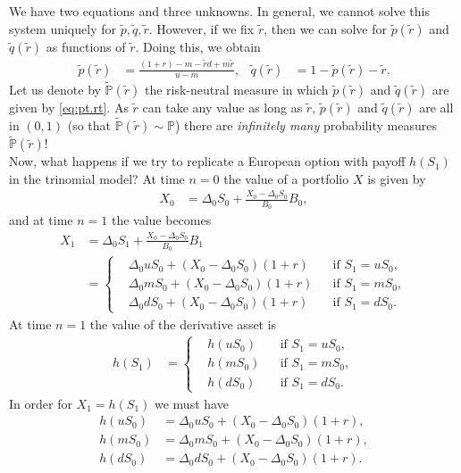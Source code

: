 \documentclass[12pt]{book}
\numberwithin{equation}{chapter}
\theoremstyle{plain}
\numberwithin{theorem}{section}
\theoremstyle{definition}
\numberwithin{exercise}{chapter}
\newcommand{\<}{\langle}
\renewcommand{\>}{\rangle}
\renewcommand{\(}{\left(}
\renewcommand{\)}{\right)}
\renewcommand{\[}{\left[}
\renewcommand{\]}{\right]}
\newcommand\Pb{\mathds{P}}
\newcommand\Del{\Delta}
\newcommand\Pbt{\widetilde{\Pb}}
\newcommand\qt{\widetilde{q}}
\newcommand\rt{\widetilde{r}}
\theoremstyle{definition}
\numberwithin{question}{section}
\newcommand\pt{\widetilde{p}}
\begin{document}
We have two equations and three unknowns. In general, we cannot solve this system uniquely for $\pt, \qt, \rt$.  However, if we fix $\rt$, then we can solve for $\pt (\rt)$ and $\qt (\rt)$ as functions of $\rt$.  Doing this, we obtain
\begin{align}
\pt (\rt) &= \frac{(1+r) - m - \rt d +  m \rt}{u - m} , &
\qt (\rt) &= 1 - \pt (\rt) - \rt . \label{eq:pt.rt}
\end{align}
Let us denote by $\Pbt (\rt)$ the risk-neutral measure in which $\pt(\rt)$ and $\qt(\rt)$ are given by \eqref{eq:pt.rt}.
As $\rt$ can take any value as long as $\rt$, $\pt(\rt)$ and $\qt(\rt)$ are all in $(0,1)$ (so that $\Pbt(\rt) \sim \Pb$) 
there are \textit{infinitely many} probability measures $\Pbt (\rt)$!
\\[0.5em]
Now, what happens if we try to replicate a European option with payoff $h(S_1)$ in the trinomial model? At time $n=0$ the value of a portfolio $X$ is given by
\begin{align}
X_0 
	&= \Del_0 S_0 +\frac{X_0 - \Delta_0 S_0}{B_0} B_0 ,
\end{align}
and at time $n=1$ the value becomes
\begin{align}
X_1 &= \Delta_0 S_1 + \frac{X_0 - \Delta_0 S_0}{B_0} B_1 \\
		&=	\left\{
		\begin{aligned}
			&\Delta_0 u S_0 + (X_0 - \Delta_0 S_0) (1+r) && \text{if $S_1 = u S_0$} ,\\
			&\Delta_0 m S_0 + (X_0 - \Delta_0 S_0) (1+r) && \text{if $S_1 = m S_0$} , \\
			&\Delta_0 d S_0 + (X_0 - \Delta_0 S_0) (1+r) && \text{if $S_1 = d S_0$} .
		\end{aligned} \right.
\end{align}
At time $n=1$ the value of the derivative asset is
\begin{align}
h(S_1) 		
	&=	\left\{
		\begin{aligned}
			&h(u S_0) && \text{if $S_1 = u S_0$} ,\\
			&h(m S_0) && \text{if $S_1 = m S_0$} , \\
			&h(d S_0) && \text{if $S_1 = d S_0$} .
		\end{aligned} \right.
\end{align}
In order for $X_1 = h(S_1)$ we must have
\begin{align}
h(u S_0)
	&=	\Delta_0 u S_0 + (X_0 - \Delta_0 S_0) (1+r)  , \\
h(m S_0)
	&=	\Delta_0 m S_0 + (X_0 - \Delta_0 S_0) (1+r) , \\
h(d S_0)
	&=	\Delta_0 d S_0 + (X_0 - \Delta_0 S_0) (1+r)  .
\end{align}
\end{document}
